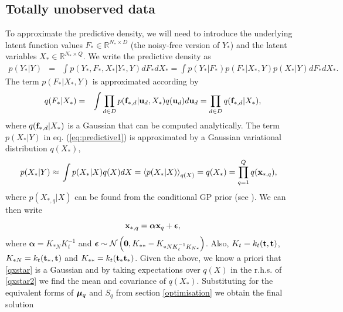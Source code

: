 \documentclass{article} %
\begin{document}
\subsection{Totally unobserved data \label{unobservedData}}
To approximate the predictive density, we will need to introduce the underlying latent function values $F_* \in \mathbb{R}^{N_* \times D}$ (the noisy-free version of $Y_*$) and the latent variables $X_* \in \mathbb{R}^{N_* \times Q}$. We  write the predictive density as
\begin{eqnarray}
p(Y_* | Y) & = & \int p(Y_*, F_*, X_*| Y_*, Y) d F_* d X_* =  \int p(Y_* | F_*)  p(F_*|X_*, Y) p(X_*|  Y) d F_* d X_* .
\label{eq:predictive1}
\end{eqnarray}
The term $p(F_* |X_*, Y)$ is approximated according by
\begin{eqnarray}
q(F_*|X_*) & = & \int \prod_{d \in D} p(\mathbf{f}_{*,d} | \mathbf{u}_d, X_*)  q(\mathbf{u}_d) d \mathbf{u}_d 
	    = \prod_{d \in D} q(\mathbf{f}_{*,d} | X_*)  ,
\end{eqnarray}
where $q(\mathbf{f}_{*,d} | X_*)$ is a Gaussian that can be computed analytically.%
The term $p(X_*| Y)$ in eq. (\ref{eq:predictive1}) is approximated by
a Gaussian variational distribution $q(X_*)$,
%
\begin{align}
p(X_* | Y) \approx {}& \int  p(X_* | X) q(X) dX = \left\langle  p(X_* | X) \right\rangle_{q(X)} = q(X_*) = \prod_{q=1}^Q q(\mathbf{x}_{*,q}),\label{qxstar}
\end{align}
%
where $p( X_{*,q} | X)$ can be found from the conditional GP prior
(see \cite{rasmussen-williams}). We can then write
%
\begin{equation}
\label{qxstar2}
\mathbf{x}_{*,q} = \boldsymbol \alpha \mathbf{x}_q + \boldsymbol \epsilon,
\end{equation} 
%
where $\boldsymbol \alpha = K_{*N}K_t^{-1}$ and 
$\boldsymbol \epsilon \sim \mathcal{N} \left( \mathbf{0}, K_{**} - K_{*N K_t^{-1} K_{N*}}\right)$. Also, $K_t = k_t(\mathbf{t}, \mathbf{t})$, $K_{*N} = k_t(\mathbf{t}_*, \mathbf{t})$ and $K_{**} = k_t(\mathbf{t}_* \mathbf{t}_*)$. 
Given the above, we know a priori that \eqref{qxstar} is a Gaussian and by taking expectations over $q(X)$ in the r.h.s. of \eqref{qxstar2} we find the mean and covariance of $q(X_*)$. Substituting for the equivalent forms of $\boldsymbol \mu_q$ and $S_q$ from section \ref{optimisation} we obtain the final solution
\end{document}
